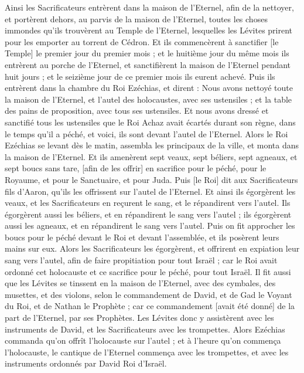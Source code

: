 \begin{multicols}{2}
Ainsi les Sacrificateurs entrèrent dans la maison de l'Eternel, afin de la nettoyer, et portèrent dehors, au parvis de la maison de l'Eternel, toutes les choses immondes qu'ils trouvèrent au Temple de l'Eternel, lesquelles les Lévites prirent pour les emporter au torrent de Cédron.
Et ils commencèrent à sanctifier [le Temple] le premier jour du premier mois ; et le huitième jour du même mois ils entrèrent au porche de l'Eternel, et sanctifièrent la maison de l'Eternel pendant huit jours ; et le seizième jour de ce premier mois ils eurent achevé.
Puis ils entrèrent dans la chambre du Roi Ezéchias, et dirent : Nous avons nettoyé toute la maison de l'Eternel, et l'autel des holocaustes, avec ses ustensiles ; et la table des pains de proposition, avec tous ses ustensiles.
Et nous avons dressé et sanctifié tous les ustensiles que le Roi Achaz avait écartés durant son règne, dans le temps qu'il a péché, et voici, ils sont devant l'autel de l'Eternel.
Alors le Roi Ezéchias se levant dès le matin, assembla les principaux de la ville, et monta dans la maison de l'Eternel.
Et ils amenèrent sept veaux, sept béliers, sept agneaux, et sept boucs sans tare, [afin de les offrir] en sacrifice pour le péché, pour le Royaume, et pour le Sanctuaire, et pour Juda. Puis [le Roi] dit aux Sacrificateurs fils d'Aaron, qu'ils les offrissent sur l'autel de l'Eternel.
Et ainsi ils égorgèrent les veaux, et les Sacrificateurs en reçurent le sang, et le répandirent vers l'autel. Ils égorgèrent aussi les béliers, et en répandirent le sang vers l'autel ; ils égorgèrent aussi les agneaux, et en répandirent le sang vers l'autel.
Puis on fit approcher les boucs pour le péché devant le Roi et devant l'assemblée, et ils posèrent leurs mains sur eux.
Alors les Sacrificateurs les égorgèrent, et offrirent en expiation leur sang vers l'autel, afin de faire propitiation pour tout Israël ; car le Roi avait ordonné cet holocauste et ce sacrifice pour le péché, pour tout Israël.
Il fit aussi que les Lévites se tinssent en la maison de l'Eternel, avec des cymbales, des musettes, et des violons, selon le commandement de David, et de Gad le Voyant du Roi, et de Nathan le Prophète ; car ce commandement [avait été donné] de la part de l'Eternel, par ses Prophètes.
Les Lévites donc y assistèrent avec les instruments de David, et les Sacrificateurs avec les trompettes.
Alors Ezéchias commanda qu'on offrît l'holocauste sur l'autel ; et à l'heure qu'on commença l'holocauste, le cantique de l'Eternel commença avec les trompettes, et avec les instruments ordonnés par David Roi d'Israël.

\end{multicols}
